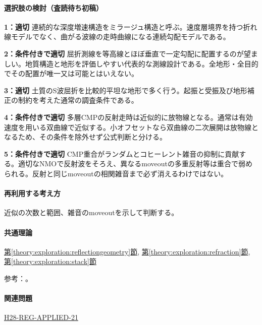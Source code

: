 \paragraph{選択肢の検討（査読待ち初稿）}\mbox{}\par

\noindent\textbf{1：適切} 連続的な深度増速構造をミラージュ構造と呼ぶ。速度層境界を持つ折れ線モデルでなく、曲がる波線の走時曲線になる連続勾配モデルである。\par

\noindent\textbf{2：条件付きで適切} 屈折測線を等高線とほぼ垂直で一定勾配に配置するのが望ましい。地質構造と地形を評価しやすい代表的な測線設計である。全地形・全目的でその配置が唯一又は可能とはいえない。\par

\noindent\textbf{3：適切} 土質のS波屈折を比較的平坦な地形で多く行う。起振と受振及び地形補正の制約を考えた通常の調査条件である。\par

\noindent\textbf{4：条件付きで適切} 多層CMPの反射走時は近似的に放物線となる。通常は有効速度を用いる双曲線で近似する。小オフセットなら双曲線の二次展開は放物線となるため、その条件を除外せず公式判断と分ける。\par

\noindent\textbf{5：条件付きで適切} CMP重合がランダムとコヒーレント雑音の抑制に貢献する。適切なNMOで反射波をそろえ、異なるmoveoutの多重反射等は重合で弱められる。反射と同じmoveoutの相関雑音まで必ず消えるわけではない。\par

\paragraph{再利用する考え方} 近似の次数と範囲、雑音のmoveoutを示して判断する。

\paragraph{共通理論} \hyperref[theory:exploration:reflectiongeometry]{第\ref*{theory:exploration:reflectiongeometry}節}, \hyperref[theory:exploration:refraction]{第\ref*{theory:exploration:refraction}節}, \hyperref[theory:exploration:stack]{第\ref*{theory:exploration:stack}節}

\par 参考：\cite{epa_seismic_reflection,jica_refraction2015,usgs_processing2000}。

\paragraph{関連問題} \hyperref[q:h28-reg-applied-21]{H28-REG-APPLIED-21}

